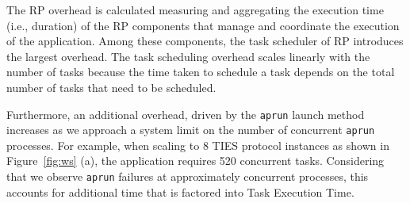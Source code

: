 
The RP overhead is calculated measuring and aggregating the execution time
(i.e., duration) of the RP components that manage and coordinate the
execution of the application. Among these components, the task scheduler of
RP introduces the largest overhead. The task scheduling overhead scales
linearly with the number of tasks because the time taken to schedule a task
depends on the total number of tasks that need to be scheduled. 


Furthermore, an additional overhead, driven by the \texttt{aprun} launch
method increases as we approach a system limit on the number of concurrent
\texttt{aprun} processes. For example, when scaling to 8 TIES protocol
instances as shown in Figure~\ref{fig:ws} (a), the application
requires 520 concurrent tasks. Considering that we observe \texttt{aprun}
failures at approximately  concurrent processes, this accounts for
additional time that is factored into Task Execution Time. 


